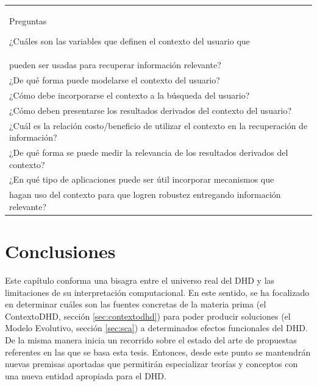 \begin{center}

\begin{tabular}[t]{|l|}
\hline
\rowcolor{gray}
Preguntas
\hline


\item ¿Cuáles son las variables que definen el contexto del usuario que\\
pueden ser usadas para recuperar información relevante? \\
\hline
\item ¿De qué forma puede modelarse el contexto del usuario? \\
\hline
\item ¿Cómo debe incorporarse el contexto a la búsqueda del usuario?\\
\hline
\item ¿Cómo deben presentarse los resultados derivados del contexto del
usuario?\\
\hline
\item ¿Cuál es la relación costo/beneficio de utilizar el contexto en la
recuperación de información?\\
\hline
\item ¿De qué forma se puede medir la relevancia de los resultados derivados del
contexto?\\
\hline
\item ¿En qué tipo de aplicaciones puede ser útil incorporar mecanismos
que\\
hagan uso del contexto para que logren robustez entregando información
relevante?\\
\hline


\end{tabular}
\end{center}




\section{Conclusiones}

Este capítulo conforma una bisagra entre el universo real del DHD y
las limitaciones de su interpretación computacional. En este sentido, se ha focalizado en determinar cuáles son las fuentes concretas de la
materia prima (el ContextoDHD, sección \ref{sec:contextodhd}) para poder
producir soluciones (el Modelo Evolutivo, sección \ref{sec:sca})
a determinados efectos funcionales del DHD. De la misma manera inicia un
recorrido sobre el estado del arte de propuestas referentes en las que se basa
esta tesis. Entonces, desde este punto se mantendrán nuevas premisas aportadas
que permitirán especializar teorías y conceptos con una nueva entidad
apropiada para el DHD.

